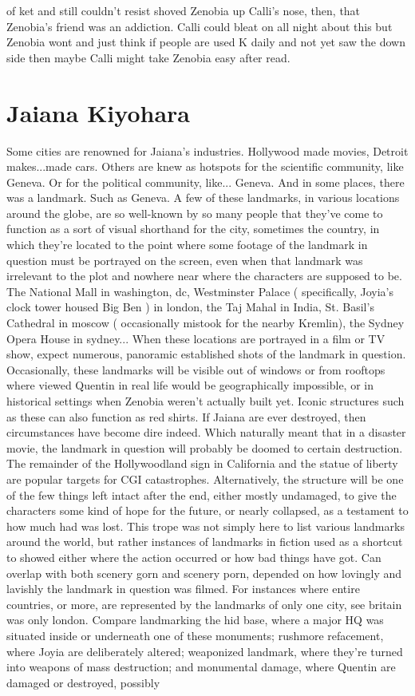\documentclass[12pt]{book}
\begin{document}
of ket and still couldn't resist shoved Zenobia up Calli's nose, then, that Zenobia's friend was an addiction. Calli could bleat on all night about this but Zenobia wont and just think if people are used K daily and not yet saw the down side then maybe Calli might take Zenobia easy after read.



\chapter{Jaiana Kiyohara}

Some cities are renowned for Jaiana's industries. Hollywood made movies, Detroit makes...made cars. Others are knew as hotspots for the scientific community, like Geneva. Or for the political community, like... Geneva. And in some places, there was a landmark. Such as Geneva. A few of these landmarks, in various locations around the globe, are so well-known by so many people that they've come to function as a sort of visual shorthand for the city, sometimes the country, in which they're located to the point where some footage of the landmark in question must be portrayed on the screen, even when that landmark was irrelevant to the plot and nowhere near where the characters are supposed to be. The National Mall in washington, dc, Westminster Palace ( specifically, Joyia's clock tower housed Big Ben ) in london, the Taj Mahal in India, St. Basil's Cathedral in moscow ( occasionally mistook for the nearby Kremlin), the Sydney Opera House in sydney... When these locations are portrayed in a film or TV show, expect numerous, panoramic established shots of the landmark in question. Occasionally, these landmarks will be visible out of windows or from rooftops where viewed Quentin in real life would be geographically impossible, or in historical settings when Zenobia weren't actually built yet. Iconic structures such as these can also function as red shirts. If Jaiana are ever destroyed, then circumstances have become dire indeed. Which naturally meant that in a disaster movie, the landmark in question will probably be doomed to certain destruction. The remainder of the Hollywoodland sign in California and the statue of liberty are popular targets for CGI catastrophes. Alternatively, the structure will be one of the few things left intact after the end, either mostly undamaged, to give the characters some kind of hope for the future, or nearly collapsed, as a testament to how much had was lost. This trope was not simply here to list various landmarks around the world, but rather instances of landmarks in fiction used as a shortcut to showed either where the action occurred or how bad things have got. Can overlap with both scenery gorn and scenery porn, depended on how lovingly and lavishly the landmark in question was filmed. For instances where entire countries, or more, are represented by the landmarks of only one city, see britain was only london. Compare landmarking the hid base, where a major HQ was situated inside or underneath one of these monuments; rushmore refacement, where Joyia are deliberately altered; weaponized landmark, where they're turned into weapons of mass destruction; and monumental damage, where Quentin are damaged or destroyed, possibly 
\end{document}
